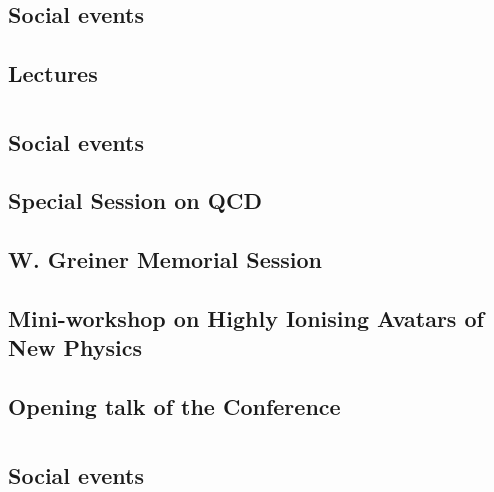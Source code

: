 

\tableofcontents
\clearpage
\section{}
\subsection{Social events}

\clearpage

\subsection{Lectures}

\clearpage

\section{}
\subsection{Social events}

\clearpage

\subsection{Special Session on QCD}

\clearpage

\subsection{W. Greiner Memorial Session}

\clearpage

\subsection{Mini-workshop on Highly Ionising Avatars of New Physics}

\clearpage

\subsection{Opening talk of the Conference}

\clearpage

\section{}
\subsection{Social events}

\clearpage

